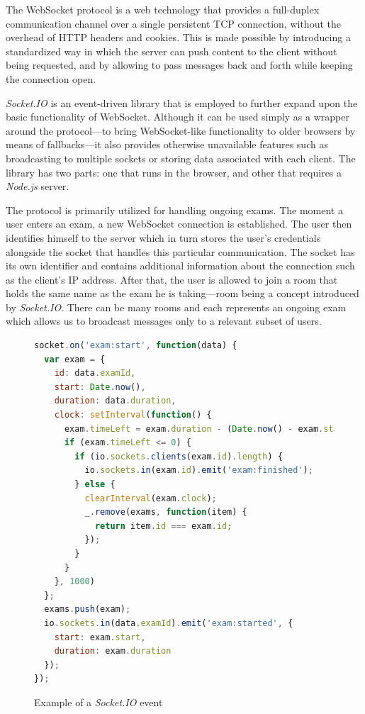 \documentclass[thesis=M,english,hidelinks]{FITthesis}[2012/10/20]
\begin{document}
The WebSocket protocol is a web technology that provides a full-duplex communication channel over a single persistent TCP connection, without the overhead of HTTP headers and cookies. This is made possible by introducing a standardized way in which the server can push content to the client without being requested, and by allowing to pass messages back and forth while keeping the connection open.

\textit{Socket.IO} is an event-driven library that is employed to further expand upon the basic functionality of WebSocket. Although it can be used simply as a wrapper around the protocol---to bring WebSocket-like functionality to older browsers by means of fallbacks---it also provides otherwise unavailable features such as broadcasting to multiple sockets or storing data associated with each client. The library has two parts: one that runs in the browser, and other that requires a \textit{Node.js} server.

The protocol is primarily utilized for handling ongoing exams. The moment a user enters an exam, a new WebSocket connection is established. The user then identifies himself to the server which in turn stores the user's credentials alongside the socket that handles this particular communication. The socket has its own identifier and contains additional information about the connection such as the client's IP address. After that, the user is allowed to join a room that holds the same name as the exam he is taking---room being a concept introduced by \textit{Socket.IO}. There can be many rooms and each represents an ongoing exam which allows us to broadcast messages only to a relevant subset of users.

\begin{figure}[h]
  \begin{lstlisting}[language=JavaScript]
socket.on('exam:start', function(data) {
  var exam = {
    id: data.examId,
    start: Date.now(),
    duration: data.duration,
    clock: setInterval(function() {
      exam.timeLeft = exam.duration - (Date.now() - exam.start);
      if (exam.timeLeft <= 0) {
        if (io.sockets.clients(exam.id).length) {
          io.sockets.in(exam.id).emit('exam:finished');
        } else {
          clearInterval(exam.clock);
          _.remove(exams, function(item) {
            return item.id === exam.id;
          });
        }
      }
    }, 1000)
  };
  exams.push(exam);
  io.sockets.in(data.examId).emit('exam:started', {
    start: exam.start,
    duration: exam.duration
  });
});
  \end{lstlisting}
  \caption{Example of a \textit{Socket.IO} event}
  \label{fig:socketio_event}
\end{figure}
\end{document}
